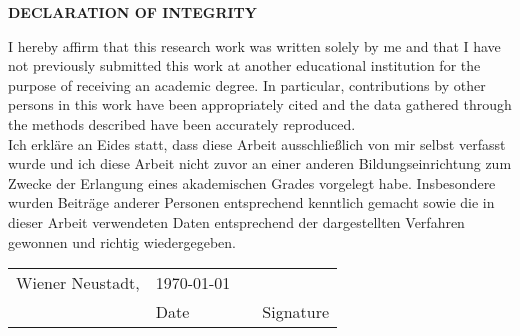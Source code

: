\vspace{150pt}

\begin{center}
{\noindent\fontsize{18pt}{21.6pt}\color{header-blue}\textbf{DECLARATION OF INTEGRITY}}
\end{center}

\vspace{30pt}

\noindent
I hereby affirm that this research work was written solely by me and that I have not previously submitted this work at another educational institution for the purpose of receiving an academic degree. In particular, contributions by other persons in this work have been appropriately cited and the data gathered through the methods described have been accurately reproduced.
\\

\noindent
Ich erkläre an Eides statt, dass diese Arbeit ausschließlich von mir selbst verfasst wurde und ich diese Arbeit nicht zuvor an einer anderen Bildungseinrichtung zum Zwecke der Erlangung eines akademischen Grades vorgelegt habe. Insbesondere wurden Beiträge anderer Personen entsprechend kenntlich gemacht sowie die in dieser Arbeit verwendeten Daten entsprechend der dargestellten Verfahren gewonnen und richtig wiedergegeben.

\vspace{130pt}

\begin{center}
\begin{tabular}{p{4cm} >{\centering}p{3cm} p{1cm} >{\centering}p{6cm}}
    Wiener Neustadt, & \today & &  \\ \cline{2-2} \cline{4-4}
       & Date &  & Signature \\
\end{tabular}
\end{center}

\clearpage